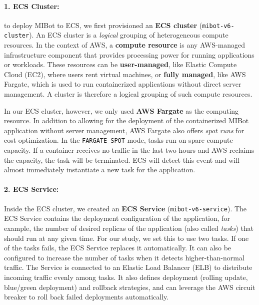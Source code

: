 \paragraph{1. ECS Cluster:} to deploy MIBot to ECS, we first provisioned an \textbf{ECS cluster} (\texttt{mibot-v6-cluster}). An ECS cluster is a \textit{logical} grouping of heterogeneous compute resources. In the context of AWS, a \textbf{compute resource} is any AWS-managed infrastructure component that provides processing power for running applications or workloads. These resources can be \textbf{user-managed}, like Elastic Compute Cloud (EC2), where users rent virtual machines, or \textbf{fully managed}, like AWS Fargate, which is used to run containerized applications without direct server management. A cluster is therefore a logical grouping of such compute resources.

In our ECS cluster, however, we only used \textbf{AWS Fargate} as the computing resource. In addition to allowing for the deployment of the containerized MIBot application without server management, AWS Fargate also offers \emph{spot runs} for cost optimization. In the \texttt{FARGATE\_SPOT} mode, tasks run on spare compute capacity. If a container receives no traffic in the last two hours and AWS reclaims the capacity, the task will be terminated. ECS will detect this event and will almost immediately instantiate a new task for the application.

\paragraph{2. ECS Service:}Inside the ECS cluster, we created an \textbf{ECS Service} (\texttt{mibot-v6-service}). The ECS Service contains the deployment configuration of the application, for example, the number of desired replicas of the application (also called \emph{tasks}) that should run at any given time.  For our study, we set this to use two tasks. If one of the tasks fails, the ECS Service replaces it automatically. It can also be configured to increase the number of tasks when it detects higher-than-normal traffic. The Service is connected to an Elastic Load Balancer (ELB) to distribute incoming traffic evenly among tasks. It also defines deployment (rolling update, blue/green deployment) and rollback strategies, and can leverage the AWS circuit breaker to roll back failed deployments automatically.

